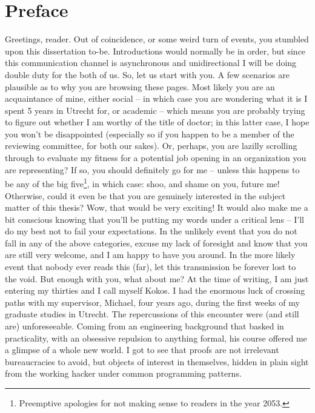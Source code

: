 \chapter*{Preface}

Greetings, reader. Out of coincidence, or some weird turn of events, you stumbled upon this dissertation to-be. 
Introductions would normally be in order, but since this communication channel is asynchronous and unidirectional I will be doing double duty for the both of us.
So, let us start with you. 
A few scenarios are plausible as to why you are browsing these pages. 
Most likely you are an acquaintance of mine, either social – in which case you are wondering what it is I spent 5 years in Utrecht for, or academic – which means you are probably trying to figure out whether I am worthy of the title of doctor; 
in this latter case, I hope you won’t be disappointed (especially so if you happen to be a member of the reviewing committee, for both our sakes).
Or, perhaps, you are lazilly scrolling through to evaluate my fitness for a potential job opening in an organization you are representing? 
If so, you should definitely go for me – unless this happens to be any of the big five\footnote{Preemptive
apologies for not making sense to readers in the year 2053.}, in which case: shoo, and shame on you, future me!
Otherwise, could it even be that you are genuinely interested in the subject matter of this thesis? 
Wow, that would be very exciting! 
It would also make me a bit conscious knowing that you’ll be putting my words under a critical lens – I’ll do my best not to fail your expectations. 
In the unlikely event that you do not fall in any of the above categories, excuse my lack of foresight and know that you are still very welcome, and I am happy to have you around. 
In the more likely event that nobody ever reads this (far), let this transmission be forever lost to the void.
But enough with you, what about me? 
At the time of writing, I am just entering my thirties and I call myself Kokos. 
I had the enormous luck of crossing paths with my supervisor, Michael, four years ago, during the first weeks of my graduate studies in Utrecht. 
The repercussions of this encounter were (and still are) unforeseeable. 
Coming from an engineering background that basked in practicality, with an obsessive repulsion to anything formal, his course offered me a glimpse of a whole new world. 
I got to see that proofs are not irrelevant bureaucracies to avoid, but objects of interest in themselves, hidden in plain sight from the working hacker under common programming patterns. 
